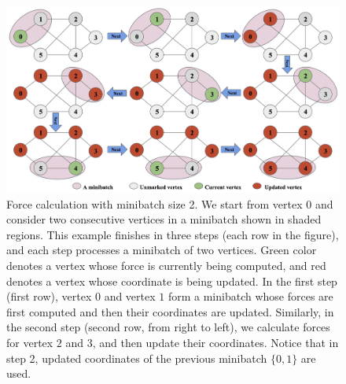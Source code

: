 \documentclass{vgtc}
\begin{document}
\begin{figure}[!htb]
    \centering
    \includegraphics[width=\linewidth]{figures/smu.png}
    \caption{Force calculation with minibatch size 2. We start from vertex $0$ and consider two consecutive vertices in a minibatch shown in shaded regions. 
    This example finishes in three steps (each row in the figure), and each step processes a minibatch of two vertices.
    Green color denotes a vertex whose force is currently being computed, and red denotes a vertex whose coordinate is being updated. 
    In the first step (first row), vertex $0$ and vertex $1$ form a minibatch whose forces are first computed and then their coordinates are updated. 
    Similarly, in the second step (second row, from right to left), we calculate forces for vertex $2$ and $3$, and then update their coordinates. 
    Notice that in step 2, updated coordinates of the previous minibatch $\{0, 1\}$ are used.
    }
    \vspace{-0.5cm}
    \label{fig:BatchLayoutfig}
\end{figure}
\end{document}
